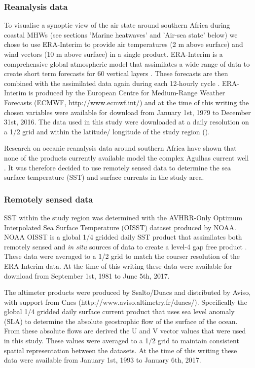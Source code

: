 \documentclass[a4paper,10pt,review]{elsarticle}
\begin{document}
\subsubsection{Reanalysis data}
To visualise a synoptic view of the air state around southern Africa during coastal MHWs (see sections 'Marine heatwaves' and 'Air-sea state' below) we chose to use ERA-Interim to provide air temperatures (2 m above surface) and wind vectors (10 m above surface) in a single product. ERA-Interim is a comprehensive global atmospheric model that assimilates a wide range of data to create short term forecasts for 60 vertical layers \citep{Dee2011}. These forecasts are then combined with the assimilated data again during each 12-hourly cycle \citep{Dee2011}. ERA-Interim is produced by the European Centre for Medium-Range Weather Forecasts (ECMWF, http://www.ecmwf.int/) and at the time of this writing the chosen variables were available for download from January 1st, 1979 to December 31st, 2016. The data used in this study were downloaded at a daily resolution on a 1/2\degree \: grid and within the latitude/ longitude of the study region ().

Research on oceanic reanalysis data around southern Africa have shown that none of the products currently available model the complex Agulhas current well \citep{Cooper2014}. It was therefore decided to use remotely sensed data to determine the sea surface temperature (SST) and surface currents in the study area.

\subsubsection{Remotely sensed data}
SST within the study region was determined with the AVHRR-Only Optimum Interpolated Sea Surface Temperature (OISST) dataset produced by NOAA. NOAA OISST is a global 1/4\degree \: gridded daily SST product that assimilates both remotely sensed and \emph{in situ} sources of data to create a level-4 gap free product \citep{Banzon2016}. These data were averaged to a 1/2\degree \: grid to match the courser resolution of the ERA-Interim data. At the time of this writing these data were available for download from September 1st, 1981 to June 5th, 2017.

The altimeter products were produced by Ssalto/Duacs and distributed by Aviso, with support from Cnes (http://www.aviso.altimetry.fr/duacs/). Specifically the global 1/4\degree \: gridded daily surface current product that uses sea level anomaly (SLA) to determine the absolute geostrophic flow of the surface of the ocean. From these absolute flows are derived the U and V vector values that were used in this study. These values were averaged to a 1/2\degree \: grid to maintain consistent spatial representation between the datasets. At the time of this writing these data were available from January 1st, 1993 to January 6th, 2017.
\end{document}
